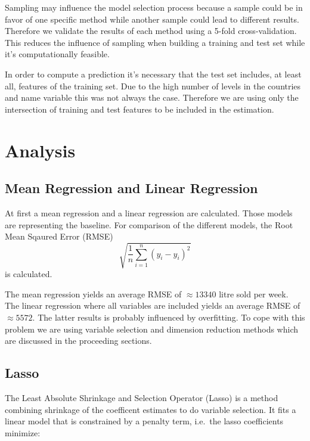 \documentclass[11pt,]{article}
\begin{document}
Sampling may influence the model selection process because a sample
could be in favor of one specific method while another sample could lead
to different results. Therefore we validate the results of each method
using a 5-fold cross-validation. This reduces the influence of sampling
when building a training and test set while it's computationally
feasible.

In order to compute a prediction it's necessary that the test set
includes, at least all, features of the training set. Due to the high
number of levels in the countries and name variable this was not always
the case. Therefore we are using only the intersection of training and
test features to be included in the estimation.

\hypertarget{analysis}{%
\section{Analysis}\label{analysis}}

\hypertarget{mean-regression-and-linear-regression}{%
\subsection{Mean Regression and Linear
Regression}\label{mean-regression-and-linear-regression}}

At first a mean regression and a linear regression are calculated. Those
models are representing the baseline. For comparison of the different
models, the Root Mean Sqaured Error (RMSE)
\[\sqrt{\frac{1}{n}\sum_{i = 1}^{n}\left(y_i-\hat{y}_i\right)^2}\] is
calculated.

The mean regression yields an average RMSE of \(\approx 13340\) litre
sold per week. The linear regression where all variables are included
yields an average RMSE of \(\approx 5572\). The latter results is
probably influenced by overfitting. To cope with this problem we are
using variable selection and dimension reduction methods which are
discussed in the proceeding sections.

\hypertarget{lasso}{%
\subsection{Lasso}\label{lasso}}

The Least Absolute Shrinkage and Selection Operator (Lasso) is a method
combining shrinkage of the coefficent estimates to do variable
selection. It fits a linear model that is constrained by a penalty term,
i.e.~the lasso coefficients minimize:
\end{document}
